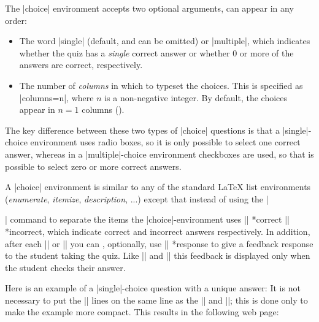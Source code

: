 \documentclass[svgnames]{article}
\begin{document}
  The \LatexCode|choice| environment accepts two optional arguments,
  can appear in any order:
  \begin{itemize}
    \item{}
    The word \LatexCode|single| (default, and can be omitted) or
    \LatexCode|multiple|, which indicates whether the quiz has a
    \textit{single} correct answer or whether 0 or more of the answers are
    correct, respectively.
    \item {}
    The number of \textit{columns} in which to typeset the choices. This
    is specified as \LatexCode|columns=n|, where $n$ is a non-negative integer.
    By default, the choices appear in $n=1$ columns
    ().
  \end{itemize}
  The key difference between these two types of \LatexCode|choice|
  questions is that a \LatexCode|single|-choice environment uses radio
  boxes, so it is only possible to select one correct answer, whereas in a
  \LatexCode|multiple|-choice environment checkboxes are used, so that is
  possible to select zero or more correct answers.

  A \LatexCode|choice| environment is similar to any of the standard
  \LaTeX{} list environments (\textit{enumerate}, \textit{itemize},
  \textit{description}, ...) except that instead of using the
  \LatexCode|\item| command to separate the items the
  \LatexCode|choice|-environment uses \LatexCode|\correct|
  *{correct} \LatexCode|\incorrect|
  *{incorrect}, which indicate correct
  and incorrect answers respectively.  In addition, after each
  \LatexCode|\correct| or \LatexCode|\incorrect| you can , optionally, use
  \LatexCode|\response| *{response} to give
  a feedback response to the student taking the quiz. Like
  \LatexCode|\whenRight| and \LatexCode|\whenWrong| this feedback is
  displayed only when the student checks their answer.

  Here is an example of a \LatexCode|single|-choice question with a unique
  answer:
  It is not necessary to put the \LatexCode|\response| lines on the same
  line as the \LatexCode|\incorrect| and \LatexCode|\incorrect|; this is
  done only to make the example more compact. This results in the
  following web page:
\end{document}
